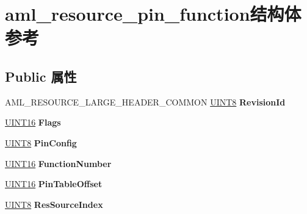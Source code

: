\hypertarget{structaml__resource__pin__function}{}\section{aml\+\_\+resource\+\_\+pin\+\_\+function结构体 参考}
\label{structaml__resource__pin__function}
\subsection*{Public 属性}
\begin{DoxyCompactItemize}
\item 
\mbox{\label{structaml__resource__pin__function_a2fe0eec1ce9bc4e7665cbe2f3ce756d3}} 
A\+M\+L\+\_\+\+R\+E\+S\+O\+U\+R\+C\+E\+\_\+\+L\+A\+R\+G\+E\+\_\+\+H\+E\+A\+D\+E\+R\+\_\+\+C\+O\+M\+M\+ON \hyperlink{_processor_bind_8h_ab27e9918b538ce9d8ca692479b375b6a}{U\+I\+N\+T8} {\bfseries Revision\+Id}
\item 
\mbox{\label{structaml__resource__pin__function_a9ed0dba316d5d4592634135c1939714a}} 
\hyperlink{_processor_bind_8h_a09f1a1fb2293e33483cc8d44aefb1eb1}{U\+I\+N\+T16} {\bfseries Flags}
\item 
\mbox{\label{structaml__resource__pin__function_afdc351fe06a28d028d4c214159db3d37}} 
\hyperlink{_processor_bind_8h_ab27e9918b538ce9d8ca692479b375b6a}{U\+I\+N\+T8} {\bfseries Pin\+Config}
\item 
\mbox{\label{structaml__resource__pin__function_aed92b0cf5d6e1bbe89c9c8128b4f1d2d}} 
\hyperlink{_processor_bind_8h_a09f1a1fb2293e33483cc8d44aefb1eb1}{U\+I\+N\+T16} {\bfseries Function\+Number}
\item 
\mbox{\label{structaml__resource__pin__function_ab63a7a1e24c9500322bb48ad0a5a6254}} 
\hyperlink{_processor_bind_8h_a09f1a1fb2293e33483cc8d44aefb1eb1}{U\+I\+N\+T16} {\bfseries Pin\+Table\+Offset}
\item 
\mbox{\label{structaml__resource__pin__function_a6ed42a20affa5f1876619ac45d2fa571}} 
\hyperlink{_processor_bind_8h_ab27e9918b538ce9d8ca692479b375b6a}{U\+I\+N\+T8} {\bfseries Res\+Source\+Index}

\end{DoxyCompactItemize}
